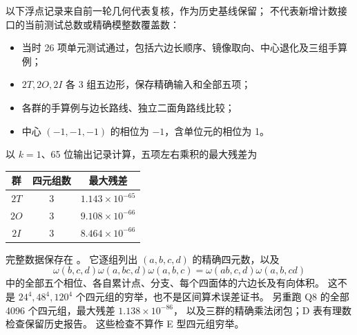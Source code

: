 \documentclass[UTF8,11pt,fontset=none]{ctexart}
\theoremstyle{definition}
\begin{document}
以下浮点记录来自前一轮几何代表复核，作为历史基线保留；
不代表新增计数接口的当前测试总数或精确模整数覆盖数：
\begin{itemize}
\item 当时 26 项单元测试通过，包括六边长顺序、镜像取向、中心退化及三组手算例；
\item $2T,2O,2I$ 各 3 组五边形，保存精确输入和全部五项；
\item 各群的手算例与边长路线、独立二面角路线比较；
\item 中心 $(-1,-1,-1)$ 的相位为 $-1$，含单位元的相位为 1。
\end{itemize}
以 $k=1$、65 位输出记录计算，五项左右乘积的最大残差为
\begin{longtable}{@{}c c c@{}}
\toprule
群 & 四元组数 & 最大残差\\ \midrule
$2T$ & 3 & $1.143\times10^{-65}$\\
$2O$ & 3 & $9.108\times10^{-66}$\\
$2I$ & 3 & $8.464\times10^{-66}$\\
\bottomrule
\end{longtable}
完整数据保存在 。
它逐组列出 $(a,b,c,d)$ 的精确四元数，以及
\[
\omega(b,c,d)\omega(a,bc,d)\omega(a,b,c)
=\omega(ab,c,d)\omega(a,b,cd)
\]
中的全部五个相位、各自累计点、分支、每个四面体的六边长及有向体积。
这不是 $24^4,48^4,120^4$ 个四元组的穷举，也不是区间算术误差证书。
另重跑 Q8 的全部 4096 个四元组，最大残差 $1.138\times10^{-86}$，
以及三群的精确乘法闭包；D 表有理数检查保留历史报告。
这些检查不算作 E 型四元组穷举。
\end{document}
